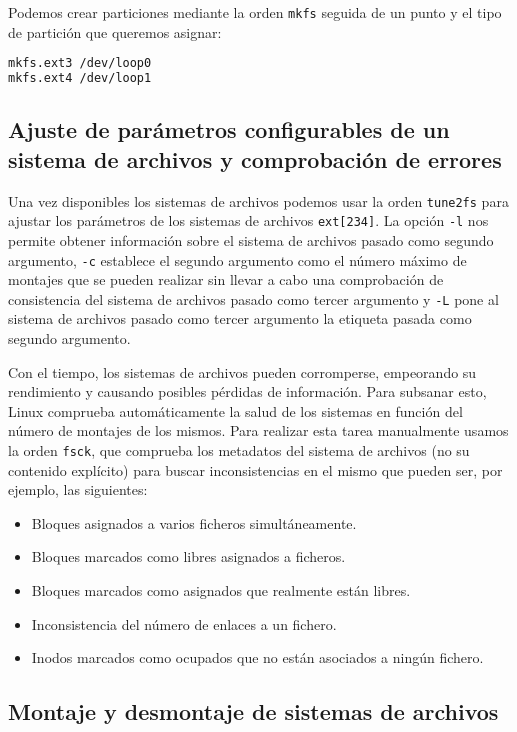 Podemos crear particiones mediante la orden \texttt{mkfs} seguida de un punto y el tipo de partición que queremos asignar:

\begin{lstlisting}[language=Bash]
mkfs.ext3 /dev/loop0
mkfs.ext4 /dev/loop1
\end{lstlisting}

\subsection{Ajuste de parámetros configurables de un sistema de archivos y comprobación de errores}

Una vez disponibles los sistemas de archivos podemos usar la orden \texttt{tune2fs} para ajustar los parámetros de los sistemas de archivos \texttt{ext[234]}.
La opción \texttt{-l} nos permite obtener información sobre el sistema de archivos pasado como segundo argumento, \texttt{-c} establece el segundo argumento como el número máximo de montajes que se pueden realizar sin llevar a cabo una comprobación de consistencia del sistema de archivos pasado como tercer argumento y \texttt{-L} pone al sistema de archivos pasado como tercer argumento la etiqueta pasada como segundo argumento.

Con el tiempo, los sistemas de archivos pueden corromperse, empeorando su rendimiento y causando posibles pérdidas de información.
Para subsanar esto, Linux comprueba automáticamente la salud de los sistemas en función del número de montajes de los mismos.
Para realizar esta tarea manualmente usamos la orden \texttt{fsck}, que comprueba los metadatos del sistema de archivos (no su contenido explícito) para buscar inconsistencias en el mismo que pueden ser, por ejemplo, las siguientes:

\begin{itemize}
	\item Bloques asignados a varios ficheros simultáneamente.
	\item Bloques marcados como libres asignados a ficheros.
	\item Bloques marcados como asignados que realmente están libres.
	\item Inconsistencia del número de enlaces a un fichero.
	\item Inodos marcados como ocupados que no están asociados a ningún fichero.
\end{itemize}

\subsection{Montaje y desmontaje de sistemas de archivos}

